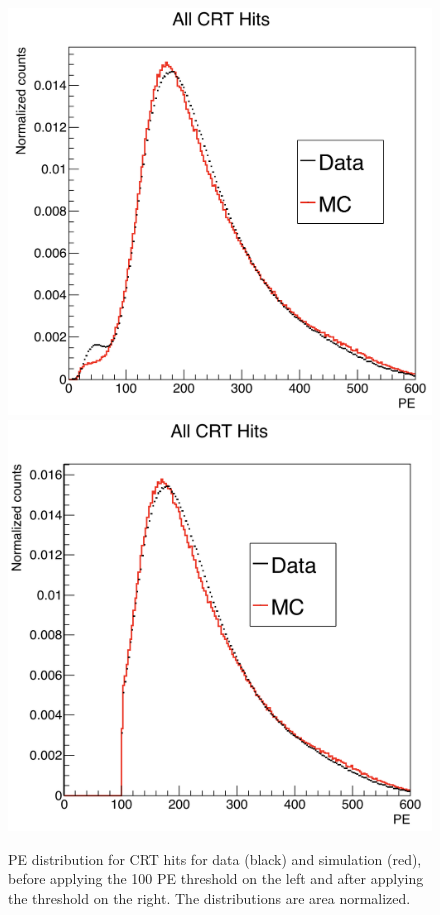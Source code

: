 \begin{figure}[h!]
\centering
\includegraphics[scale=0.35]{images/CRTPENoCut}
\includegraphics[scale=0.35]{images/CRTPECut}
\caption{PE distribution for CRT hits for data (black) and simulation (red),  before applying the 100 PE threshold on the left and after applying the threshold on the right. The distributions are area normalized.}
\label{fig:CRTPe}
\end{figure}



